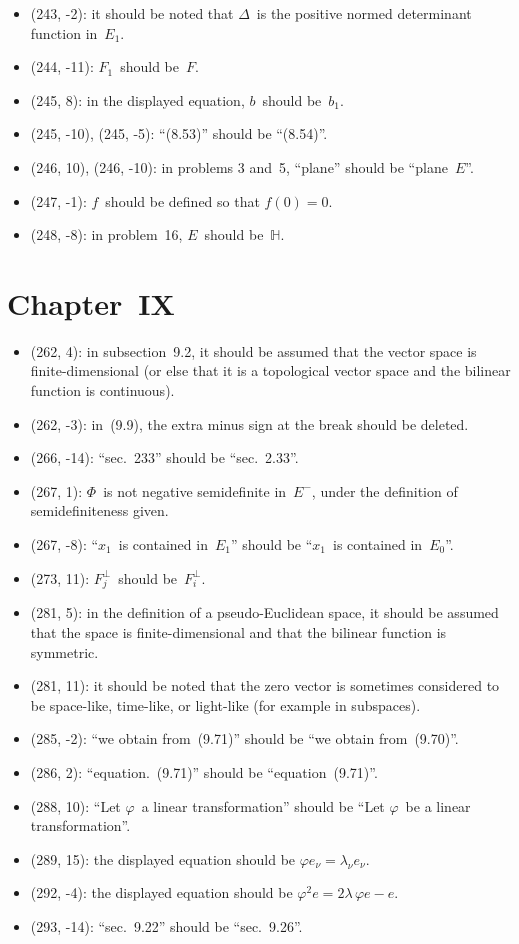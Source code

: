 \documentclass[letterpaper,12pt]{article}
\renewcommand{\H}{\mathbb{H}}
\newcommand{\oc}[1]{#1^{\perp}}
\begin{document}
\begin{itemize}
\item (243, -2): it should be noted that \(\Delta\)~is the positive normed determinant function in~\(E_1\).
\item (244, -11): \(F_1\)~should be~\(F\).
\item (245, 8): in the displayed equation, \(b\)~should be~\(b_1\).
\item (245, -10), (245, -5): ``(8.53)'' should be ``(8.54)''.
\item (246, 10), (246, -10): in problems 3 and~5, ``plane'' should be ``plane~\(E\)''.
\item (247, -1): \(f\)~should be defined so that \(f(0)=0\).
\item (248, -8): in problem~16, \(E\)~should be~\(\H\).
\end{itemize}

\section*{Chapter~IX}
\begin{itemize}
\item (262, 4): in subsection~9.2, it should be assumed that the vector space is finite-dimensional (or else that it is a topological vector space and the bilinear function is continuous).
\item (262, -3): in~(9.9), the extra minus sign at the break should be deleted.
\item (266, -14): ``sec.~233'' should be ``sec.~2.33''.
\item (267, 1): \(\Phi\)~is not negative semidefinite in~\(E^-\), under the definition of semidefiniteness given.
\item (267, -8): ``\(x_1\)~is contained in~\(E_1\)'' should be ``\(x_1\)~is contained in~\(E_0\)''.
\item (273, 11): \(\oc{F_j}\)~should be~\(\oc{F_i}\).
\item (281, 5): in the definition of a pseudo-Euclidean space, it should be assumed that the space is finite-dimensional and that the bilinear function is symmetric.
\item (281, 11): it should be noted that the zero vector is sometimes considered to be space-like, time-like, or light-like (for example in subspaces).
\item (285, -2): ``we obtain from~(9.71)'' should be ``we obtain from~(9.70)''.
\item (286, 2): ``equation.~(9.71)'' should be ``equation~(9.71)''.
\item (288, 10): ``Let \(\varphi\)~a linear transformation'' should be ``Let \(\varphi\)~be a linear transformation''.
\item (289, 15): the displayed equation should be \(\varphi e_{\nu}=\lambda_{\nu}e_{\nu}\).
\item (292, -4): the displayed equation should be \(\varphi^2e=2\lambda\,\varphi e-e\).
\item (293, -14): ``sec.~9.22'' should be ``sec.~9.26''.
\end{itemize}
\end{document}
